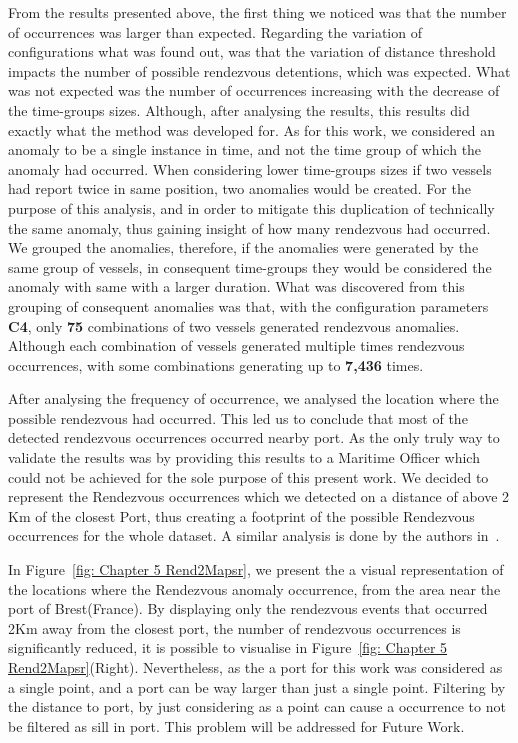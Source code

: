 From the results presented above, the first thing we noticed was that the number of occurrences was larger than expected. Regarding the variation of configurations what was found out, was that the variation of distance threshold impacts the number of possible rendezvous detentions, which was expected.
What was not expected was the number of occurrences increasing with the decrease of the time-groups sizes. 
Although, after analysing the results, this results did exactly what the method was developed for. As for this work, we considered an anomaly to be a single instance in time, and not the time group of which the anomaly had occurred. When considering lower time-groups sizes if two vessels had report twice in same position, two anomalies would be created. For the purpose of this analysis, and in order to mitigate this duplication of technically the same anomaly, thus gaining insight of how many rendezvous had occurred. We grouped the anomalies, therefore, if the anomalies were generated by the same group of vessels, in consequent time-groups they would be considered the anomaly with same with a larger duration. 
What was discovered from this grouping of consequent anomalies was that, with the configuration parameters \textbf{C4}, only \textbf{75} combinations of two vessels generated rendezvous anomalies. Although each combination of vessels generated multiple times rendezvous occurrences, with some combinations generating up to \textbf{7,436} times.

After analysing the frequency of occurrence, we analysed the location where the possible rendezvous had occurred. This led us to conclude that most of the detected rendezvous occurrences occurred nearby port.
As the only truly way to validate the results was by providing this results to a Maritime Officer which could not be achieved for the sole purpose of this present work. We decided to represent the Rendezvous occurrences which we detected on a distance of above 2 Km of the closest Port, thus creating a footprint of the possible Rendezvous occurrences for the whole dataset. A similar analysis is done by the authors in~\cite{Miller2018IdentifyingBehavior}. 

In Figure~\ref{fig: Chapter 5 Rend2Mapsr}, we present the a visual representation of the locations where the Rendezvous anomaly occurrence, from the area near the port of Brest(France). By displaying only the rendezvous events that occurred 2Km away from the closest port, the number of rendezvous occurrences is significantly reduced, it is possible to visualise in Figure~\ref{fig: Chapter 5 Rend2Mapsr}(Right). Nevertheless, as the a port for this work was considered as a single point, and a port can be way larger than just a single point. Filtering by the distance to port, by just considering as a point can cause a occurrence to not be filtered as sill in port. This problem will be addressed for Future Work.


